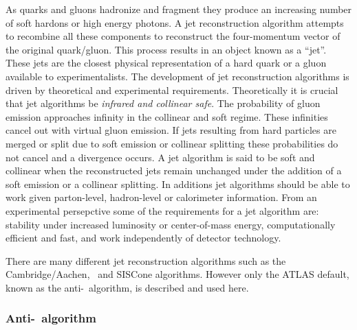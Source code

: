 As quarks and gluons hadronize and fragment they produce an increasing number of soft hardons or high energy photons. A jet reconstruction algorithm attempts to recombine all these components to reconstruct the four-momentum vector of the original quark/gluon. This process results in an object known as a ``jet''. These jets are the closest physical representation of a hard quark or a gluon available to experimentalists. The development of jet reconstruction algorithms is driven by theoretical and experimental requirements. Theoretically it is crucial that jet algorithms be \emph{infrared and collinear safe}. The probability of gluon emission approaches infinity in the collinear and soft regime. These infinities cancel out with virtual gluon emission. If jets resulting from hard particles are merged or split due to soft emission or collinear splitting these probabilities do not cancel and a divergence occurs. A jet algorithm is said to be soft and collinear when the reconstructed jets remain unchanged under the addition of a soft emission or a collinear splitting. In additions jet algorithms should be able to work given parton-level, hadron-level or calorimeter information. From an experimental persepctive some of the requirements for a jet algorithm are: stability under increased luminosity or center-of-mass energy, computationally efficient and fast, and work independently of detector technology. 

There are many different jet reconstruction algorithms such as the Cambridge/Aachen, \kt\ and SISCone algorithms. However only the ATLAS default, known as the anti-\kt\ algorithm, is described and used here.

\subsubsection{Anti-\kt\ algorithm}

